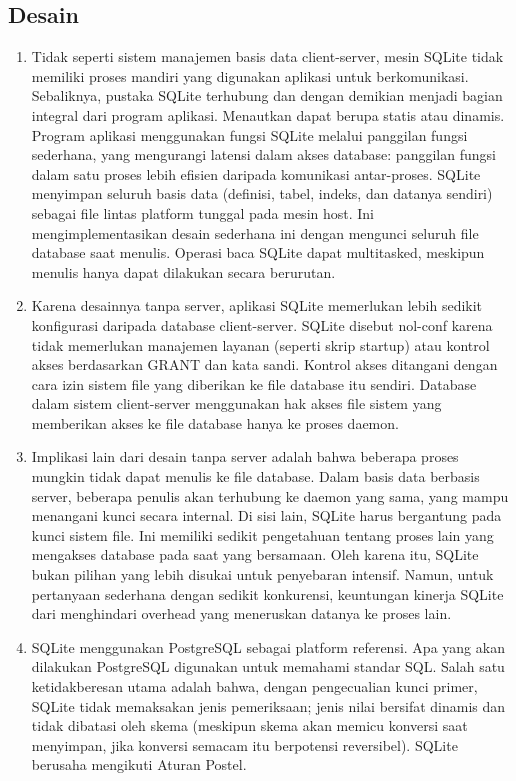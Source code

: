 \begin{enumerate}
	\subsection{Desain}
		\begin{enumerate}
			\item Tidak seperti sistem manajemen basis data client-server, mesin SQLite tidak memiliki proses mandiri yang digunakan aplikasi untuk berkomunikasi. Sebaliknya, pustaka SQLite terhubung dan dengan demikian menjadi bagian integral dari program aplikasi. Menautkan dapat berupa statis atau dinamis. Program aplikasi menggunakan fungsi SQLite melalui panggilan fungsi sederhana, yang mengurangi latensi dalam akses database: panggilan fungsi dalam satu proses lebih efisien daripada komunikasi antar-proses. SQLite menyimpan seluruh basis data (definisi, tabel, indeks, dan datanya sendiri) sebagai file lintas platform tunggal pada mesin host. Ini mengimplementasikan desain sederhana ini dengan mengunci seluruh file database saat menulis. Operasi baca SQLite dapat multitasked, meskipun menulis hanya dapat dilakukan secara berurutan.
			\item Karena desainnya tanpa server, aplikasi SQLite memerlukan lebih sedikit konfigurasi daripada database client-server. SQLite disebut nol-conf karena tidak memerlukan manajemen layanan (seperti skrip startup) atau kontrol akses berdasarkan GRANT dan kata sandi. Kontrol akses ditangani dengan cara izin sistem file yang diberikan ke file database itu sendiri. Database dalam sistem client-server menggunakan hak akses file sistem yang memberikan akses ke file database hanya ke proses daemon.
			\item Implikasi lain dari desain tanpa server adalah bahwa beberapa proses mungkin tidak dapat menulis ke file database. Dalam basis data berbasis server, beberapa penulis akan terhubung ke daemon yang sama, yang mampu menangani kunci secara internal. Di sisi lain, SQLite harus bergantung pada kunci sistem file. Ini memiliki sedikit pengetahuan tentang proses lain yang mengakses database pada saat yang bersamaan. Oleh karena itu, SQLite bukan pilihan yang lebih disukai untuk penyebaran intensif. Namun, untuk pertanyaan sederhana dengan sedikit konkurensi, keuntungan kinerja SQLite dari menghindari overhead yang meneruskan datanya ke proses lain.
			\item SQLite menggunakan PostgreSQL sebagai platform referensi. Apa yang akan dilakukan PostgreSQL digunakan untuk memahami standar SQL. Salah satu ketidakberesan utama adalah bahwa, dengan pengecualian kunci primer, SQLite tidak memaksakan jenis pemeriksaan; jenis nilai bersifat dinamis dan tidak dibatasi oleh skema (meskipun skema akan memicu konversi saat menyimpan, jika konversi semacam itu berpotensi reversibel). SQLite berusaha mengikuti Aturan Postel.
		\end{enumerate}
		

\end{enumerate}
